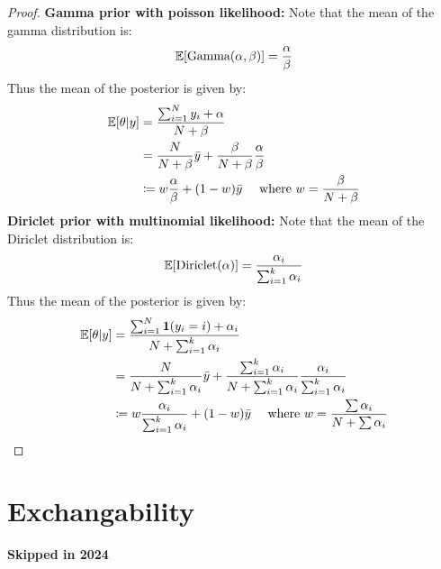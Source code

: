 \documentclass[DIV=14,titlepage=false]{scrreprt}
\begin{document}
\begin{proof}
    \textbf{Gamma prior with poisson likelihood:}
    Note that the mean of the gamma distribution is:
    \[
        \mathbb{E}[\text{Gamma}(\alpha,\beta)] = \frac{\alpha}{\beta}
    \]
    Thus the mean of the posterior is given by:
    \begin{align*}
        \mathbb{E}[\theta|y] &= \frac{\sum_{i=1}^N y_i + \alpha}{N+\beta}\\
        &= \frac{N}{N+\beta}\bar{y} + \frac{\beta}{N+\beta}\frac{\alpha}{\beta}\\
        &\coloneq w \frac{\alpha}{\beta} + (1-w)\bar{y} \quad \text{ where } w = \frac{\beta}{N+\beta}
    \end{align*}
    \textbf{Diriclet prior with multinomial likelihood:}
    Note that the mean of the Diriclet distribution is:
    \[
        \mathbb{E}[\text{Diriclet}(\alpha)] = \frac{\alpha_i}{\sum_{i=1}^k \alpha_i}
    \]
    Thus the mean of the posterior is given by:
    \begin{align*}
        \mathbb{E}[\theta|y] &= \frac{\sum_{i=1}^N \mathbf{1}(y_i=i) + \alpha_i}{N+\sum_{i=1}^k \alpha_i}\\
        &= \frac{N}{N+\sum_{i=1}^k \alpha_i}\bar{y} + \frac{\sum_{i=1}^k \alpha_i}{N+\sum_{i=1}^k \alpha_i}\frac{\alpha_i}{\sum_{i=1}^k \alpha_i}\\
        &\coloneq w \frac{\alpha_i}{\sum_{i=1}^k \alpha_i} + (1-w)\bar{y} \quad \text{ where } w = \frac{\sum{\alpha_i}}{N+\sum{\alpha_i}}
    \end{align*}
\end{proof}
\section{Exchangability}
\textbf{Skipped in 2024}
\end{document}
